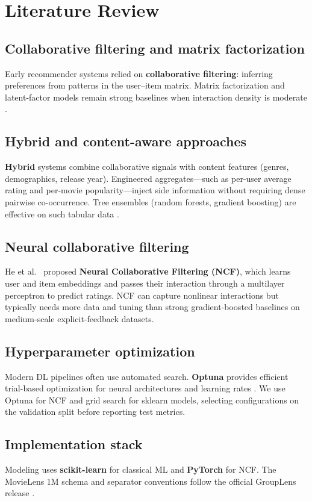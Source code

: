\section{Literature Review}

\subsection{Collaborative filtering and matrix factorization}

Early recommender systems relied on \textbf{collaborative filtering}: inferring preferences from
patterns in the user--item matrix.
Matrix factorization and latent-factor models remain strong baselines when
interaction density is moderate \cite{rendle2009bpr}.

\subsection{Hybrid and content-aware approaches}

\textbf{Hybrid} systems combine collaborative signals with content features (genres, demographics, release year).
Engineered aggregates---such as per-user average rating and per-movie popularity---inject side information
without requiring dense pairwise co-occurrence.
Tree ensembles (random forests, gradient boosting) are effective on such tabular data
\cite{breiman2001random,friedman2001gradient}.

\subsection{Neural collaborative filtering}

He et al.\ \cite{he2017ncf} proposed \textbf{Neural Collaborative Filtering (NCF)}, which learns user and item
embeddings and passes their interaction through a multilayer perceptron to predict ratings.
NCF can capture nonlinear interactions but typically needs more data and tuning than strong gradient-boosted
baselines on medium-scale explicit-feedback datasets.

\subsection{Hyperparameter optimization}

Modern DL pipelines often use automated search.
\textbf{Optuna} provides efficient trial-based optimization for neural architectures and learning rates
\cite{akiba2019optuna}.
We use Optuna for NCF and grid search for sklearn models, selecting configurations on the validation split
before reporting test metrics.

\subsection{Implementation stack}

Modeling uses \textbf{scikit-learn} \cite{pedregosa2011sklearn} for classical ML and
\textbf{PyTorch} \cite{paszke2019pytorch} for NCF.
The MovieLens 1M schema and separator conventions follow the official GroupLens release
\cite{harper2015movielens}.
